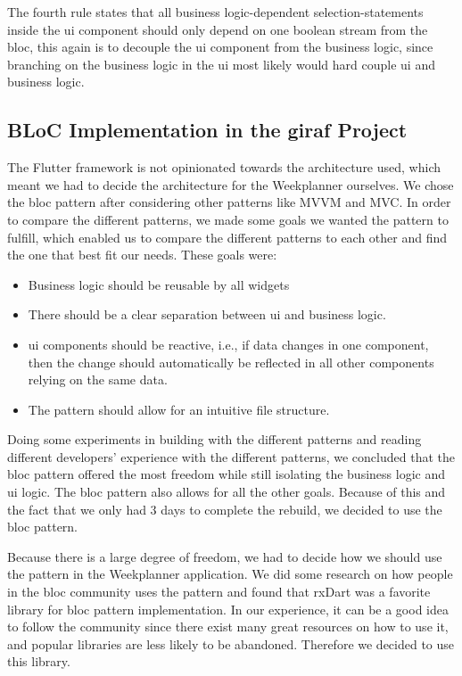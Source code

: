 The fourth rule states that all business logic-dependent selection-statements inside the \gls{ui} component should only depend on one boolean stream from the \gls{bloc}, this again is to decouple the \gls{ui} component from the business logic, since branching on the business logic in the \gls{ui} most likely would hard couple \gls{ui} and business logic.

\subsection{BLoC Implementation in the \gls{giraf} Project}

The Flutter framework is not opinionated towards the architecture used, which meant we had to decide the architecture for the Weekplanner ourselves. We chose the \gls{bloc} pattern after considering other patterns like MVVM and MVC. In order to compare the different patterns, we made some goals we wanted the pattern to fulfill, which enabled us to compare the different patterns to each other and find the one that best fit our needs. These goals were:

\begin{itemize}
  \item Business logic should be reusable by all widgets
  \item There should be a clear separation between \gls{ui} and business logic.
  \item \gls{ui} components should be reactive, i.e., if data changes in one component, then the change should automatically be reflected in all other components relying on the same data.
  \item The pattern should allow for an intuitive file structure.
\end{itemize}

Doing some experiments in building with the different patterns and reading different developers' experience with the different patterns, we concluded that the \gls{bloc} pattern offered the most freedom while still isolating the business logic and \gls{ui} logic. The \gls{bloc} pattern also allows for all the other goals. Because of this and the fact that we only had 3 days to complete the rebuild, we decided to use the \gls{bloc} pattern.

Because there is a large degree of freedom, we had to decide how we should use the pattern in the Weekplanner application. We did some research on how people in the \gls{bloc} community uses the pattern and found that rxDart was a favorite library for \gls{bloc} pattern implementation. In our experience, it can be a good idea to follow the community since there exist many great resources on how to use it, and popular libraries are less likely to be abandoned. Therefore we decided to use this library.

